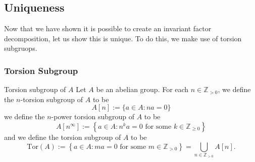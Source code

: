 \documentclass{article}
\begin{document}
\subsection{Uniqueness}
Now that we have shown it is possible to create an invariant factor decomposition, let us show this is unique. To do this, we make use of torsion subgruops.
\subsubsection{Torsion Subgroup}
\begin{definition}{Torsion subgroup of $A$}
    Let $A$ be an abelian group. For each $n\in \mathbb{Z}_{>0}$, we define the $n$-torsion subgroup of $A$ to be
    \begin{equation*}
        A[n] := \{a\in A: na = 0\}
    \end{equation*}
    we define the $n$-power torsion subgroup of $A$ to be
    \begin{equation*}
        A[n^\infty] := \left\{a\in A: n^k a = 0 \text{ for some } k \in \mathbb{Z}_{\ge 0}\right\}
    \end{equation*}
    and we define the torsion subgroup of $A$ to be
    \begin{equation*}
        \text{Tor}(A) := \left\{a\in A: ma=0 \text{ for some } m\in \mathbb{Z}_{>0}\right\} = \bigcup_{n\in \mathbb{Z}_{>0}}A[n].
    \end{equation*}
\end{definition}
\end{document}

